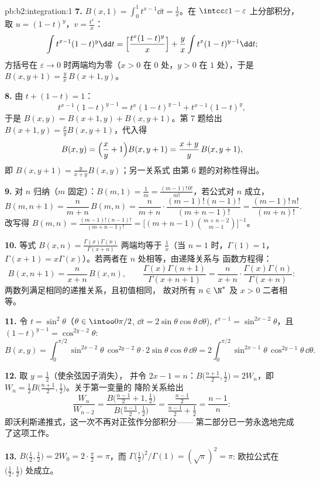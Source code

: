\begin{solution}{pb:b2:integration:1}
\textbf{7.} $B(x,1) = \int_0^1 t^{x-1}\dd t = \frac1x$。在
$\intcc\varepsilon{1-\varepsilon}$ 上分部积分，取 $u = (1-t)^y$，$v =
\frac{t^x}{x}$：
\[
\int t^{x-1}(1-t)^{y}\dd t
= \Bigl[\frac{t^x(1-t)^y}{x}\Bigr]
+ \frac{y}{x}\int t^{x}(1-t)^{y-1}\dd t ;
\]
方括号在 $\varepsilon \to 0$ 时两端均为零（$x >
0$ 在 $0$ 处，$y > 0$ 在 $1$ 处），于是 $B(x, y+1) = \frac
yx\,B(x+1, y)$。

\textbf{8.} 由 $t + (1-t) = 1$：
\[
t^{x-1}(1-t)^{y-1} = t^{x}(1-t)^{y-1} + t^{x-1}(1-t)^{y},
\]
于是 $B(x,y) = B(x+1,y) + B(x,y+1)$。第 7 题给出 $B(x+1,y) =
\frac xy B(x,y+1)$，代入得
\[
B(x,y) = \Bigl(\frac xy + 1\Bigr)B(x,y+1)
= \frac{x+y}{y}\,B(x,y+1),
\]
即 $B(x,y+1) = \frac{y}{x+y}B(x,y)$；另一关系式
由第 6 题的对称性得出。

\textbf{9.} 对 $n$ 归纳（$m$ 固定）：$B(m,1) = \frac1m =
\frac{(m-1)!\,0!}{m!}$，若公式对 $n$ 成立，
\[
B(m, n+1) = \frac{n}{m+n}\,B(m,n)
= \frac{n}{m+n}\cdot\frac{(m-1)!(n-1)!}{(m+n-1)!}
= \frac{(m-1)!\,n!}{(m+n)!} .
\]
改写得 $B(m,n) = \frac{(m-1)!(n-1)!}{(m+n-1)!} =
\bigl[(m+n-1)\binom{m+n-2}{m-1}\bigr]^{-1}$。

\textbf{10.} 等式 $B(x,n) =
\frac{\Gamma(x)\Gamma(n)}{\Gamma(x+n)}$ 两端均等于 $\frac1x$（当 $n =
1$ 时，$\Gamma(1) = 1$，$\Gamma(x+1) = x\Gamma(x)$）。若两者在
$n$ 处相等，由递降关系与
函数方程得：
\[
B(x, n+1) = \frac{n}{x+n}\,B(x,n), \qquad
\frac{\Gamma(x)\Gamma(n+1)}{\Gamma(x+n+1)}
= \frac{n}{x+n}\cdot
\frac{\Gamma(x)\Gamma(n)}{\Gamma(x+n)} :
\]
两数列满足相同的递推关系，且初值相同，
故对所有 $n \in \N^*$ 及 $x > 0$ 二者相等。

\textbf{11.} 令 $t = \sin^2\theta$（$\theta \in
\intoo0{\pi/2}$, $\dd t = 2\sin\theta\cos\theta\,\dd\theta$),
$t^{x-1} = \sin^{2x-2}\theta$，且 $(1-t)^{y-1} =
\cos^{2y-2}\theta$:
\[
B(x,y) = \int_0^{\pi/2}\sin^{2x-2}\theta\,\cos^{2y-2}\theta
\cdot 2\sin\theta\cos\theta\,\dd\theta
= 2\int_0^{\pi/2}\sin^{2x-1}\theta\,\cos^{2y-1}\theta\,
\dd\theta .
\]

\textbf{12.} 取 $y = \frac12$（使余弦因子消失），
并令 $2x - 1 = n$：$B\bigl(\frac{n+1}2, \frac12\bigr) = 2W_n$，即\
$W_n = \frac12 B\bigl(\frac{n+1}2,\frac12\bigr)$。关于第一变量的
降阶关系给出
\[
\frac{W_n}{W_{n-2}}
= \frac{B\bigl(\frac{n-1}2 + 1, \frac12\bigr)}
{B\bigl(\frac{n-1}2, \frac12\bigr)}
= \frac{\frac{n-1}2}{\frac{n-1}2 + \frac12}
= \frac{n-1}{n} :
\]
即沃利斯递推式，这一次不再对正弦作分部积分——
第二部分已一劳永逸地完成了这项工作。

\textbf{13.} $B\bigl(\frac12,\frac12\bigr) = 2W_0 =
2\cdot\frac\pi2 = \pi$，而
$\Gamma\bigl(\frac12\bigr)^2/\Gamma(1) = (\sqrt\pi)^2 = \pi$:
欧拉公式在 $\bigl(\frac12,\frac12\bigr)$ 处成立。


\end{solution}
